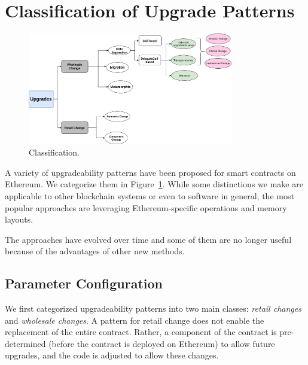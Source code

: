 \section{Classification of Upgrade Patterns}

\begin{figure}[t]
  \centering
      \includegraphics[width=0.8\textwidth]{figures/New_Classification.png}
  \caption{Classification. \label{fig:class}}
 \end{figure}
 
A variety of upgradeability patterns have been proposed for smart contracts on Ethereum. We categorize them in Figure~\ref{fig:class}. While some distinctions we make are applicable to other blockchain systems or even to software in general, the most popular approaches are leveraging Ethereum-specific operations and memory layouts.

The approaches have evolved over  time and some of them are no longer useful because of the advantages of other new methods. 



\subsection{Parameter Configuration}

We first categorized upgradeability patterns into two main classes: \textit{retail changes} and \textit{wholesale changes}. A pattern for retail change does not enable the replacement of the entire contract. Rather, a component of the contract is pre-determined (before the contract is deployed on Ethereum) to allow future upgrades, and the code is adjusted to allow these changes. 

